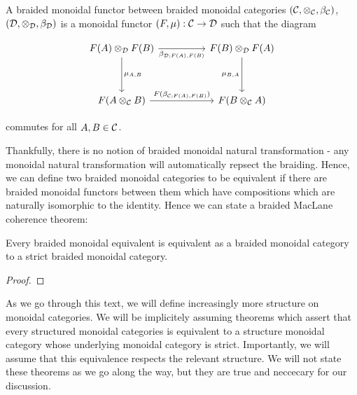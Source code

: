 \begin{defn} A braided monoidal functor between braided monoidal categories $({\mathcal C},\otimes_{{\mathcal C}},\beta_{{\mathcal C}})$, $({\mathcal D},\otimes_{{\mathcal D}},\beta_{{\mathcal D}})$ is a monoidal functor $(F,\mu):{\mathcal C}\to {\mathcal D}$ such that the diagram

\[\begin{tikzcd}
	{F(A)\otimes_{\cD}F(B)} && {F(B)\otimes_{\cD}F(A)} \\
	\\
	{F(A\otimes_{\cC}B)} && {F(B\otimes_{\cC}A)}
	\arrow["{\mu_{A,B}}", from=1-1, to=3-1]
	\arrow["{\beta_{\cD;F(A),F(B)}}"', from=1-1, to=1-3]
	\arrow["{\mu_{B,A}}"', from=1-3, to=3-3]
	\arrow["{F(\beta_{\cC;F(A),F(B)})}", from=3-1, to=3-3]
\end{tikzcd}\]

commutes for all $A,B\in {\mathcal C}$.

\raggedleft\qedsymbol{}
\end{defn}

Thankfully, there is no notion of braided monoidal natural transformation - any monoidal natural transformation will automatically repsect the braiding. Hence, we can define two braided monoidal categories to be equivalent if there are braided monoidal functors between them which have compositions which are naturally isomorphic to the identity. Hence we can state a braided MacLane coherence theorem:

\begin{thrm} Every braided monoidal equivalent is equivalent as a braided monoidal category to a strict braided monoidal category.
\end{thrm}
\begin{proof}
\end{proof}

As we go through this text, we will define increasingly more structure on monoidal categories. We will be implicitely assuming theorems which assert that every structured monoidal categories is equivalent to a structure monoidal category whose underlying monoidal category is strict. Importantly, we will assume that this equivalence respects the relevant structure. We will not state these theorems as we go along the way, but they are true and neccecary for our discussion. 

